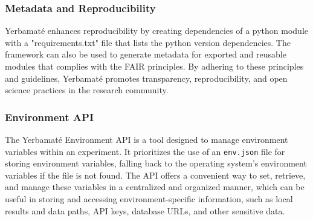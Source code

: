 
\subsubsection{Metadata and Reproducibility}

Yerbamaté enhances reproducibility by creating dependencies of a python module with a "requirements.txt" file that lists the python version dependencies. The framework can also be used to generate metadata for exported and reusable modules that complies with the FAIR principles. By adhering to these principles and guidelines, Yerbamaté promotes transparency, reproducibility, and open science practices in the research community.

\subsubsection{Environment API}

The Yerbamaté Environment API is a tool designed to manage environment variables within an experiment. It prioritizes the use of an \texttt{env.json} file for storing environment variables, falling back to the operating system's environment variables if the file is not found. The API offers a convenient way to set, retrieve, and manage these variables in a centralized and organized manner, which can be useful in storing and accessing environment-specific information, such as local results and data paths, API keys, database URLs, and other sensitive data.




